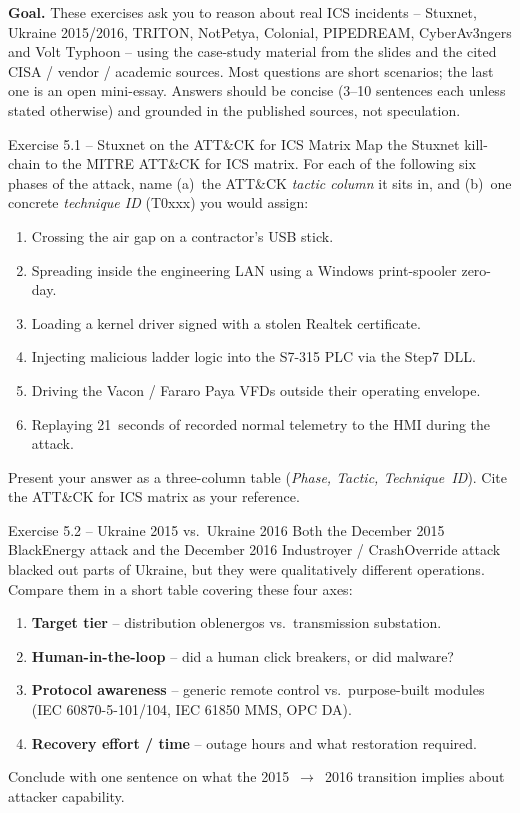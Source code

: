 \documentclass[11pt,a4paper]{article}
\begin{document}
\sheetheader

\noindent
\textbf{Goal.} These exercises ask you to reason about real ICS incidents -- Stuxnet, Ukraine 2015/2016,
TRITON, NotPetya, Colonial, PIPEDREAM, CyberAv3ngers and Volt Typhoon -- using the case-study
material from the slides and the cited CISA / vendor / academic sources. Most questions are
short scenarios; the last one is an open mini-essay. Answers should be concise (3--10 sentences
each unless stated otherwise) and grounded in the published sources, not speculation.

\begin{taskbox}{Exercise 5.1 -- Stuxnet on the ATT\&CK for ICS Matrix}
Map the Stuxnet kill-chain to the MITRE ATT\&CK for ICS matrix. For each of the following six
phases of the attack, name (a)~the ATT\&CK \emph{tactic column} it sits in, and (b)~one concrete
\emph{technique ID} (T0xxx) you would assign:
\begin{enumerate}\setlength{\itemsep}{0pt}
  \item Crossing the air gap on a contractor's USB stick.
  \item Spreading inside the engineering LAN using a Windows print-spooler zero-day.
  \item Loading a kernel driver signed with a stolen Realtek certificate.
  \item Injecting malicious ladder logic into the S7-315 PLC via the Step7 DLL.
  \item Driving the Vacon / Fararo Paya VFDs outside their operating envelope.
  \item Replaying 21~seconds of recorded normal telemetry to the HMI during the attack.
\end{enumerate}
Present your answer as a three-column table (\emph{Phase, Tactic, Technique~ID}). Cite the
ATT\&CK for ICS matrix as your reference.
\end{taskbox}

\begin{taskbox}{Exercise 5.2 -- Ukraine 2015 vs.\ Ukraine 2016}
Both the December 2015 BlackEnergy attack and the December 2016 Industroyer / CrashOverride
attack blacked out parts of Ukraine, but they were qualitatively different operations.
Compare them in a short table covering these four axes:
\begin{enumerate}\setlength{\itemsep}{0pt}
  \item \textbf{Target tier} -- distribution oblenergos vs.\ transmission substation.
  \item \textbf{Human-in-the-loop} -- did a human click breakers, or did malware?
  \item \textbf{Protocol awareness} -- generic remote control vs.\ purpose-built modules
        (IEC 60870-5-101/104, IEC 61850 MMS, OPC DA).
  \item \textbf{Recovery effort / time} -- outage hours and what restoration required.
\end{enumerate}
Conclude with one sentence on what the 2015~$\to$~2016 transition implies about attacker capability.
\end{taskbox}
\end{document}
